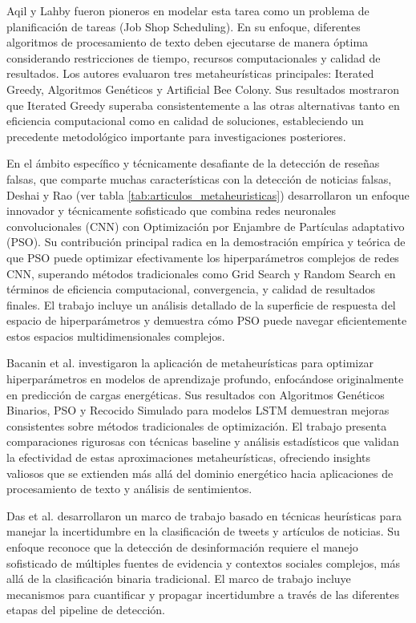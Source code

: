 Aqil y Lahby \cite{aqil2021modeling} fueron pioneros en modelar esta tarea como un problema de planificación de tareas (Job Shop Scheduling). En su enfoque, diferentes algoritmos de procesamiento de texto deben ejecutarse de manera óptima considerando restricciones de tiempo, recursos computacionales y calidad de resultados. Los autores evaluaron tres metaheurísticas principales: Iterated Greedy, Algoritmos Genéticos y Artificial Bee Colony. Sus resultados mostraron que Iterated Greedy superaba consistentemente a las otras alternativas tanto en eficiencia computacional como en calidad de soluciones, estableciendo un precedente metodológico importante para investigaciones posteriores.

En el ámbito específico y técnicamente desafiante de la detección de reseñas falsas, que comparte muchas características con la detección de noticias falsas, Deshai y Rao \cite{deshai2023unmasking} (ver tabla \ref{tab:articulos_metaheuristicas}) desarrollaron un enfoque innovador y técnicamente sofisticado que combina redes neuronales convolucionales (CNN) con Optimización por Enjambre de Partículas adaptativo (PSO). Su contribución principal radica en la demostración empírica y teórica de que PSO puede optimizar efectivamente los hiperparámetros complejos de redes CNN, superando métodos tradicionales como Grid Search y Random Search en términos de eficiencia computacional, convergencia, y calidad de resultados finales. El trabajo incluye un análisis detallado de la superficie de respuesta del espacio de hiperparámetros y demuestra cómo PSO puede navegar eficientemente estos espacios multidimensionales complejos.

Bacanin et al. \cite{bacanin2023benefits} investigaron la aplicación de metaheurísticas para optimizar hiperparámetros en modelos de aprendizaje profundo, enfocándose originalmente en predicción de cargas energéticas. Sus resultados con Algoritmos Genéticos Binarios, PSO y Recocido Simulado para modelos LSTM demuestran mejoras consistentes sobre métodos tradicionales de optimización. El trabajo presenta comparaciones rigurosas con técnicas baseline y análisis estadísticos que validan la efectividad de estas aproximaciones metaheurísticas, ofreciendo insights valiosos que se extienden más allá del dominio energético hacia aplicaciones de procesamiento de texto y análisis de sentimientos.

Das et al. \cite{das2022heuristic} desarrollaron un marco de trabajo basado en técnicas heurísticas para manejar la incertidumbre en la clasificación de tweets y artículos de noticias. Su enfoque reconoce que la detección de desinformación requiere el manejo sofisticado de múltiples fuentes de evidencia y contextos sociales complejos, más allá de la clasificación binaria tradicional. El marco de trabajo incluye mecanismos para cuantificar y propagar incertidumbre a través de las diferentes etapas del pipeline de detección.

